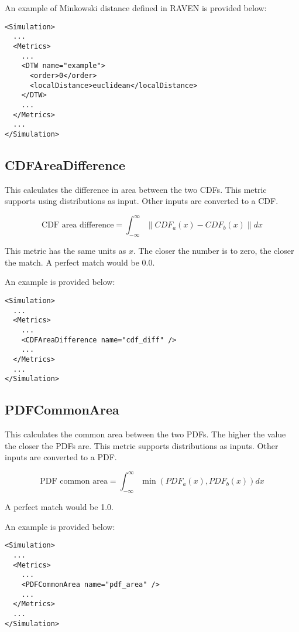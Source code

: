 An example of Minkowski distance defined in RAVEN is provided below:
\begin{lstlisting}[style=XML]
<Simulation>
  ...
  <Metrics>
    ...
    <DTW name="example">
      <order>0</order>
      <localDistance>euclidean</localDistance>
    </DTW>
    ...
  </Metrics>
  ...
</Simulation>
\end{lstlisting}

\subsection{CDFAreaDifference}

This calculates the difference in area between the two CDFs.  This
metric supports using distributions as input.  Other inputs are
converted to a CDF.

\begin{equation}
  \text{CDF area difference} = \int_{-\infty}^{\infty}{\|CDF_a(x)-CDF_b(x)\|dx}
\end{equation}

This metric has the same units as $x$.  The closer the number is
to zero, the closer the match.  A perfect match would be 0.0.

An example is provided below:
\begin{lstlisting}[style=XML]
<Simulation>
  ...
  <Metrics>
    ...
    <CDFAreaDifference name="cdf_diff" />
    ...
  </Metrics>
  ...
</Simulation>
\end{lstlisting}

\subsection{PDFCommonArea}

This calculates the common area between the two PDFs.  The higher the
value the closer the PDFs are.  This metric supports distributions as
inputs.  Other inputs are converted to a PDF.

\begin{equation}
  \text{PDF common area} = \int_{-\infty}^{\infty}{\min(PDF_a(x),PDF_b(x))}dx
\end{equation}

A perfect match would be 1.0.


An example is provided below:
\begin{lstlisting}[style=XML]
<Simulation>
  ...
  <Metrics>
    ...
    <PDFCommonArea name="pdf_area" />
    ...
  </Metrics>
  ...
</Simulation>
\end{lstlisting}

